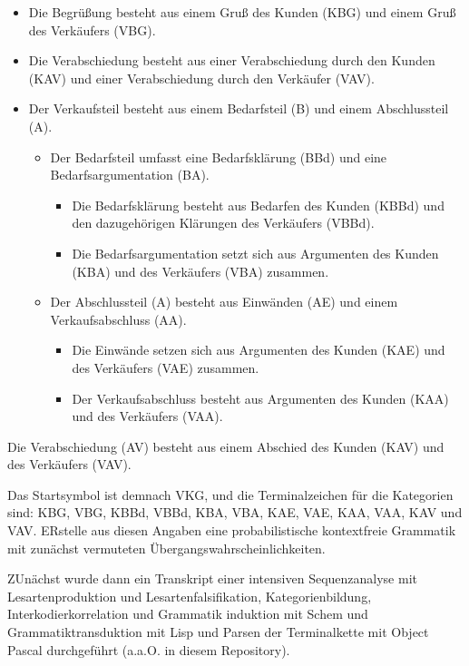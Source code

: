 \documentclass[
]{article}
\begin{document}
\begin{itemize}
\item
  Die Begrüßung besteht aus einem Gruß des Kunden (KBG) und einem Gruß
  des Verkäufers (VBG).
\item
  Die Verabschiedung besteht aus einer Verabschiedung durch den Kunden
  (KAV) und einer Verabschiedung durch den Verkäufer (VAV).
\item
  Der Verkaufsteil besteht aus einem Bedarfsteil (B) und einem
  Abschlussteil (A).

  \begin{itemize}
  \item
    Der Bedarfsteil umfasst eine Bedarfsklärung (BBd) und eine
    Bedarfsargumentation (BA).

    \begin{itemize}
    \item
      Die Bedarfsklärung besteht aus Bedarfen des Kunden (KBBd) und den
      dazugehörigen Klärungen des Verkäufers (VBBd).
    \item
      Die Bedarfsargumentation setzt sich aus Argumenten des Kunden
      (KBA) und des Verkäufers (VBA) zusammen.
    \end{itemize}
  \item
    Der Abschlussteil (A) besteht aus Einwänden (AE) und einem
    Verkaufsabschluss (AA).

    \begin{itemize}
    \item
      Die Einwände setzen sich aus Argumenten des Kunden (KAE) und des
      Verkäufers (VAE) zusammen.
    \item
      Der Verkaufsabschluss besteht aus Argumenten des Kunden (KAA) und
      des Verkäufers (VAA).
    \end{itemize}
  \end{itemize}
\end{itemize}

Die Verabschiedung (AV) besteht aus einem Abschied des Kunden (KAV) und
des Verkäufers (VAV).

Das Startsymbol ist demnach VKG, und die Terminalzeichen für die
Kategorien sind: KBG, VBG, KBBd, VBBd, KBA, VBA, KAE, VAE, KAA, VAA, KAV
und VAV. ERstelle aus diesen Angaben eine probabilistische kontextfreie
Grammatik mit zunächst vermuteten Übergangswahrscheinlichkeiten.

ZUnächst wurde dann ein Transkript einer intensiven Sequenzanalyse mit
Lesartenproduktion und Lesartenfalsifikation, Kategorienbildung,
Interkodierkorrelation und Grammatik induktion mit Schem und
Grammatiktransduktion mit Lisp und Parsen der Terminalkette mit Object
Pascal durchgeführt (a.a.O. in diesem Repository).
\end{document}
